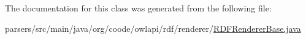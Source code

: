 The documentation for this class was generated from the following file\-:\begin{DoxyCompactItemize}
\item 
parsers/src/main/java/org/coode/owlapi/rdf/renderer/\hyperlink{_r_d_f_renderer_base_8java}{R\-D\-F\-Renderer\-Base.\-java}\end{DoxyCompactItemize}
